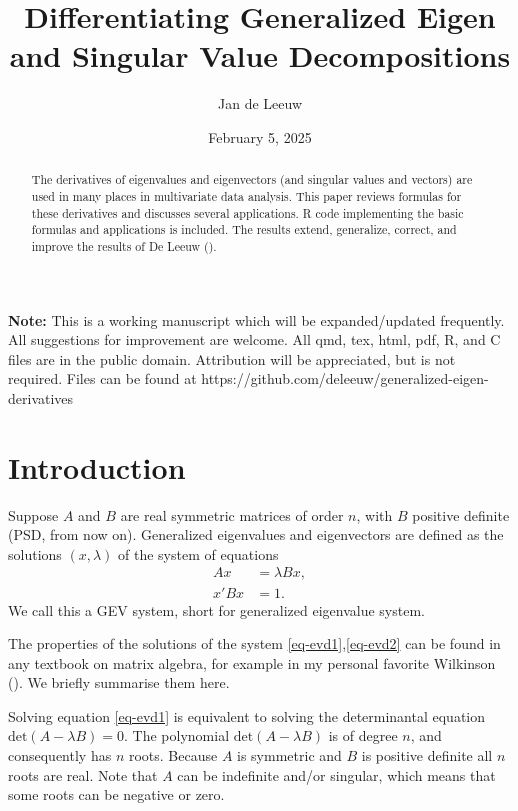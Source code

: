 \documentclass[
  12pt,
  letterpaper,
  DIV=11,
  numbers=noendperiod]{scrartcl}
\title{Differentiating Generalized Eigen and Singular Value
Decompositions}
\author{Jan de Leeuw}
\date{February 5, 2025}
\newcommand{\sectionbreak}{\clearpage}
\renewcommand*\contentsname{Table of contents}
\newcommand\contentsname{Table of contents}
\begin{document}
\maketitle
\begin{abstract}
The derivatives of eigenvalues and eigenvectors (and singular values and
vectors) are used in many places in multivariate data analysis. This
paper reviews formulas for these derivatives and discusses several
applications. R code implementing the basic formulas and applications is
included. The results extend, generalize, correct, and improve the
results of De Leeuw ().
\end{abstract}

\renewcommand*\contentsname{Table of contents}
{
\hypersetup{linkcolor=}
\setcounter{tocdepth}{3}
\tableofcontents
}

\sectionbreak

\textbf{Note:} This is a working manuscript which will be
expanded/updated frequently. All suggestions for improvement are
welcome. All qmd, tex, html, pdf, R, and C files are in the public
domain. Attribution will be appreciated, but is not required. Files can
be found at https://github.com/deleeuw/generalized-eigen-derivatives

\sectionbreak

\section{Introduction}\label{sec-intro}

Suppose \(A\) and \(B\) are real symmetric matrices of order \(n\), with
\(B\) positive definite (PSD, from now on). Generalized eigenvalues and
eigenvectors are defined as the solutions \((x,\lambda)\) of the system
of equations \begin{subequations}
\begin{align}
Ax&=\lambda Bx,\label{eq-evd1}\\
x'Bx&=1.\label{eq-evd2}
\end{align}
\end{subequations} We call this a GEV system, short for generalized
eigenvalue system.

The properties of the solutions of the system
\eqref{eq-evd1},\eqref{eq-evd2} can be found in any textbook on matrix
algebra, for example in my personal favorite Wilkinson
(). We briefly summarise them here.

Solving equation \eqref{eq-evd1} is equivalent to solving the
determinantal equation \(\text{det}(A-\lambda B)=0\). The polynomial
\(\text{det}(A-\lambda B)\) is of degree \(n\), and consequently has
\(n\) roots. Because \(A\) is symmetric and \(B\) is positive definite
all \(n\) roots are real. Note that \(A\) can be indefinite and/or
singular, which means that some roots can be negative or zero.
\end{document}
